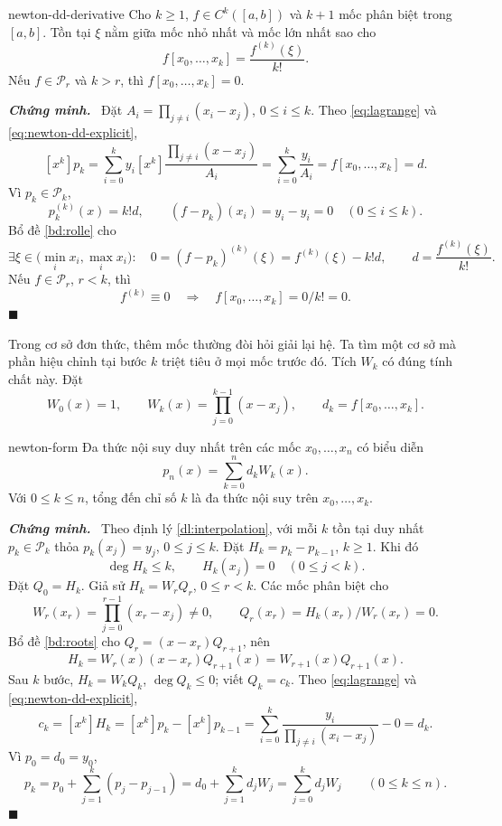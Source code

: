 \documentclass[12pt,a4paper,oneside]{book}
\numberwithin{algorithm}{chapter}
\theoremstyle{definition}
\newenvironment{chungminh}{\par\medskip\noindent\textbf{\textit{\color{mainblue}Chứng minh.}}\ }{\hfill$\blacksquare$\par\medskip}
\begin{document}
\begin{menhde}{}{newton-dd-derivative}
Cho $k\geq1$, $f\in C^k([a,b])$ và $k+1$ mốc phân biệt trong $[a,b]$. Tồn tại $\xi$ nằm giữa mốc nhỏ nhất và mốc lớn nhất sao cho
\begin{equation}\label{eq:newton-dd-derivative}
 f[x_0,\ldots,x_k]=\frac{f^{(k)}(\xi)}{k!}.
\end{equation}
Nếu $f\in\mathcal P_r$ và $k>r$, thì $f[x_0,\ldots,x_k]=0$.
\end{menhde}
\begin{chungminh}
Đặt $A_i=\prod_{j\ne i}(x_i-x_j)$, $0\leq i\leq k$. Theo \eqref{eq:lagrange} và \eqref{eq:newton-dd-explicit},
\[
 [x^k]p_k=\sum_{i=0}^{k}y_i
 \left[x^k\right]\frac{\prod_{j\ne i}(x-x_j)}{A_i}
 =\sum_{i=0}^{k}\frac{y_i}{A_i}=f[x_0,\ldots,x_k]=d.
\]
Vì $p_k\in\mathcal P_k$,
\[
 p_k^{(k)}(x)=k!d,
 \qquad (f-p_k)(x_i)=y_i-y_i=0\quad(0\leq i\leq k).
\]
Bổ đề \ref{bd:rolle} cho
\[
 \exists\xi\in\bigl(\min_i x_i,\max_i x_i\bigr):\quad
 0=(f-p_k)^{(k)}(\xi)=f^{(k)}(\xi)-k!d,
 \qquad d=\frac{f^{(k)}(\xi)}{k!}.
\]
Nếu $f\in\mathcal P_r$, $r<k$, thì
\[
 f^{(k)}\equiv0\quad\Longrightarrow\quad
 f[x_0,\ldots,x_k]=0/k!=0.
\]
\end{chungminh}

Trong cơ sở đơn thức, thêm mốc thường đòi hỏi giải lại hệ. Ta tìm một cơ sở mà phần hiệu chỉnh tại bước $k$ triệt tiêu ở mọi mốc trước đó. Tích $W_k$ có đúng tính chất này. Đặt
\[
 W_0(x)=1,\qquad W_k(x)=\prod_{j=0}^{k-1}(x-x_j),\qquad
 d_k=f[x_0,\ldots,x_k].
\]
\begin{dinhly}{}{newton-form}
Đa thức nội suy duy nhất trên các mốc $x_0,\ldots,x_n$ có biểu diễn
\begin{equation}\label{eq:newton-form}
 p_n(x)=\sum_{k=0}^{n}d_kW_k(x).
\end{equation}
Với $0\leq k\leq n$, tổng đến chỉ số $k$ là đa thức nội suy trên $x_0,\ldots,x_k$.
\end{dinhly}
\begin{chungminh}
Theo định lý \ref{dl:interpolation}, với mỗi $k$ tồn tại duy nhất $p_k\in\mathcal P_k$ thỏa $p_k(x_j)=y_j$, $0\leq j\leq k$. Đặt $H_k=p_k-p_{k-1}$, $k\geq1$. Khi đó
\[
 \deg H_k\leq k,\qquad H_k(x_j)=0\quad(0\leq j<k).
\]
Đặt $Q_0=H_k$. Giả sử $H_k=W_rQ_r$, $0\leq r<k$. Các mốc phân biệt cho
\[
 W_r(x_r)=\prod_{j=0}^{r-1}(x_r-x_j)\ne0,
 \qquad Q_r(x_r)=H_k(x_r)/W_r(x_r)=0.
\]
Bổ đề \ref{bd:roots} cho $Q_r=(x-x_r)Q_{r+1}$, nên
\[
 H_k=W_r(x)(x-x_r)Q_{r+1}(x)=W_{r+1}(x)Q_{r+1}(x).
\]
Sau $k$ bước, $H_k=W_kQ_k$, $\deg Q_k\leq0$; viết $Q_k=c_k$. Theo \eqref{eq:lagrange} và \eqref{eq:newton-dd-explicit},
\[
 c_k=[x^k]H_k=[x^k]p_k-[x^k]p_{k-1}
 =\sum_{i=0}^{k}\frac{y_i}{\prod_{j\ne i}(x_i-x_j)}-0=d_k.
\]
Vì $p_0=d_0=y_0$,
\[
 p_k=p_0+\sum_{j=1}^{k}(p_j-p_{j-1})
 =d_0+\sum_{j=1}^{k}d_jW_j
 =\sum_{j=0}^{k}d_jW_j\qquad(0\leq k\leq n).
\]
\end{chungminh}
\end{document}
